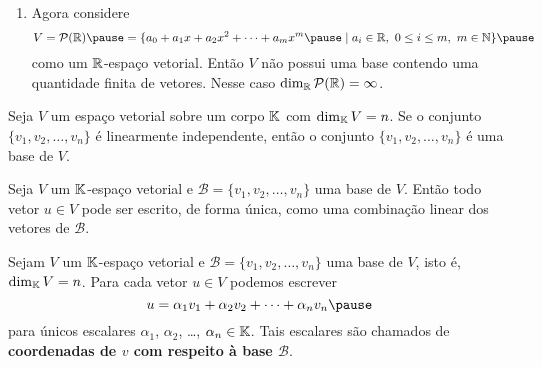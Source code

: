 \documentclass{beamer}
\begin{document}
\begin{frame}
    \begin{exemplos}
        \begin{enumerate}[label={\roman*})]
            \conti
            \item Agora considere
            \[
                V = \mathcal{P}(\real) \pause = \{a_0 + a_1x + a_2x^2 + \cdots + a_mx^m \pause \mid a_i \in \real,\ 0 \le i \le m,\ m \in \n\}\pause
            \]
            como um $\mathbb{R}$-espaço vetorial. \pause Então $V$ não possui uma base \pause contendo uma quantidade finita de vetores. \pause Nesse caso $\dim_{\mathbb{R}}\mathcal{P}(\mathbb{R}) = \infty$.
        \end{enumerate}
    \end{exemplos}
\end{frame}

\begin{frame}
  \begin{teorema}
    Seja $V$ um espaço vetorial sobre um corpo $\mathbb{K}$ \pause com $\dim_{\mathbb{K}}V = n$. \pause Se o conjunto $\{v_1, v_2, \dots, v_n\}$ \pause é linearmente independente, \pause então o conjunto $\{v_1, v_2, \dots, v_n\}$ é uma base de $V$.
  \end{teorema}
\end{frame}

\begin{frame}
  \begin{teorema}
    Seja $V$ um $\mathbb{K}$-espaço vetorial \pause e $\mathcal{B} = \{v_1, v_2, \dots, v_n\}$ uma base de $V$. \pause Então todo vetor $u \in V$ \pause pode ser escrito, de forma única, \pause como uma combinação linear dos vetores de $\mathcal{B}$.
  \end{teorema}
\end{frame}

\begin{frame}
  \begin{definicao}
    Sejam $V$ um $\mathbb{K}$-espaço vetorial \pause e $\mathcal{B} = \{v_1, v_2, \dots, v_n\}$ uma base de $V$, \pause isto é, $\dim_{\mathbb{K}}V = n$. \pause Para cada vetor $u \in V$ \pause podemos escrever
    \[
      u = \alpha_1v_1 + \alpha_2v_2 + \cdots + \alpha_nv_n\pause
    \]
    para únicos escalares \pause $\alpha_1$, $\alpha_2$, \dots, $\alpha_n \in \mathbb{K}$. \pause Tais escalares são chamados de \textbf{coordenadas de $v$ com respeito à base $\mathcal{B}$}.\pause
  \end{definicao}
\end{frame}
\end{document}
